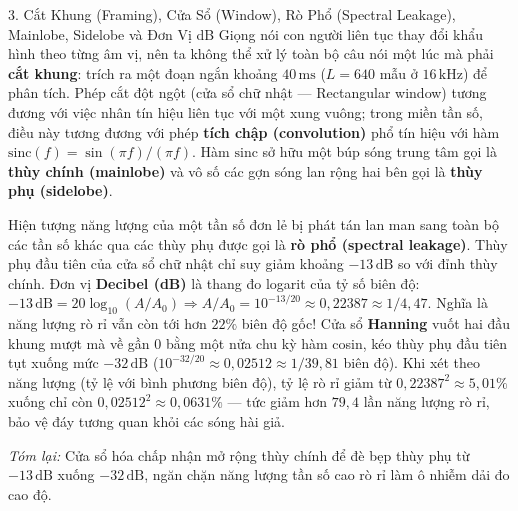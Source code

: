 \begin{feynmanbox}{3. Cắt Khung (Framing), Cửa Sổ (Window), Rò Phổ (Spectral Leakage), Mainlobe, Sidelobe và Đơn Vị dB}
Giọng nói con người liên tục thay đổi khẩu hình theo từng âm vị, nên ta không thể xử lý toàn bộ câu nói một lúc mà phải \textbf{cắt khung}: trích ra một đoạn ngắn khoảng $40\,\text{ms}$ ($L = 640$ mẫu ở $16\,\text{kHz}$) để phân tích. Phép cắt đột ngột (cửa sổ chữ nhật --- Rectangular window) tương đương với việc nhân tín hiệu liên tục với một xung vuông; trong miền tần số, điều này tương đương với phép \textbf{tích chập (convolution)} phổ tín hiệu với hàm $\mathrm{sinc}(f) = \sin(\pi f)/(\pi f)$. Hàm $\mathrm{sinc}$ sở hữu một búp sóng trung tâm gọi là \textbf{thùy chính (mainlobe)} và vô số các gợn sóng lan rộng hai bên gọi là \textbf{thùy phụ (sidelobe)}.

Hiện tượng năng lượng của một tần số đơn lẻ bị phát tán lan man sang toàn bộ các tần số khác qua các thùy phụ được gọi là \textbf{rò phổ (spectral leakage)}. Thùy phụ đầu tiên của cửa sổ chữ nhật chỉ suy giảm khoảng $-13\,\text{dB}$ so với đỉnh thùy chính. Đơn vị \textbf{Decibel (dB)} là thang đo logarit của tỷ số biên độ: $-13\,\text{dB} = 20\log_{10}(A/A_0) \Rightarrow A/A_0 = 10^{-13/20} \approx 0{,}22387 \approx 1/4{,}47$. Nghĩa là năng lượng rò rỉ vẫn còn tới hơn $22\%$ biên độ gốc! Cửa sổ \textbf{Hanning} vuốt hai đầu khung mượt mà về gần 0 bằng một nửa chu kỳ hàm cosin, kéo thùy phụ đầu tiên tụt xuống mức $-32\,\text{dB}$ ($10^{-32/20} \approx 0{,}02512 \approx 1/39{,}81$ biên độ). Khi xét theo năng lượng (tỷ lệ với bình phương biên độ), tỷ lệ rò rỉ giảm từ $0{,}22387^2 \approx 5{,}01\%$ xuống chỉ còn $0{,}02512^2 \approx 0{,}0631\%$ --- tức giảm hơn $79{,}4$ lần năng lượng rò rỉ, bảo vệ đáy tương quan khỏi các sóng hài giả.

\emph{Tóm lại:} Cửa sổ hóa chấp nhận mở rộng thùy chính để đè bẹp thùy phụ từ $-13\,\text{dB}$ xuống $-32\,\text{dB}$, ngăn chặn năng lượng tần số cao rò rỉ làm ô nhiễm dải đo cao độ.
\end{feynmanbox}

